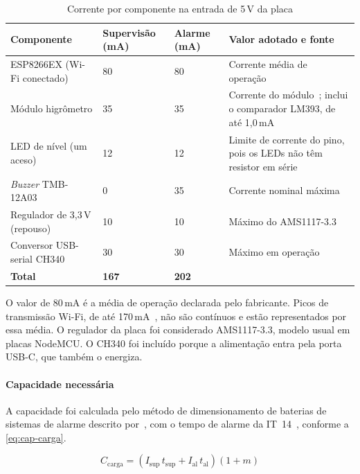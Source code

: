 \begin{table}[H]
\centering
\caption{Corrente por componente na entrada de 5\,V da placa}
\label{tab:consumo}
\small
\begin{tabular}{p{5.2cm}p{1.8cm}p{1.4cm}p{6.4cm}}
\hline
\textbf{Componente} & \textbf{Supervisão (mA)} & \textbf{Alarme (mA)} & \textbf{Valor adotado e fonte} \\
\hline
ESP8266EX (Wi-Fi conectado) & 80 & 80 & Corrente média de operação~\cite[Tabela~1-1]{espressif_esp8266ex} \\
Módulo higrômetro & 35 & 35 & Corrente do módulo~\cite{dfrobot_sen0114}; inclui o comparador LM393, de até 1,0\,mA~\cite[Seção~5.8]{ti_lm393} \\
LED de nível (um aceso) & 12 & 12 & Limite de corrente do pino, pois os LEDs não têm resistor em série~\cite[Tabela~5-1]{espressif_esp8266ex} \\
\textit{Buzzer} TMB-12A03 & 0 & 35 & Corrente nominal máxima~\cite{quickteck_tmb12a03} \\
Regulador de 3,3\,V (repouso) & 10 & 10 & Máximo do AMS1117-3.3~\cite{ams1117_datasheet} \\
Conversor USB-serial CH340 & 30 & 30 & Máximo em operação~\cite[Seção~6.2]{wch_ch340} \\
\hline
\textbf{Total} & \textbf{167} & \textbf{202} & \\
\hline
\end{tabular}
\end{table}

O valor de 80\,mA é a média de operação declarada pelo fabricante. Picos
de transmissão Wi-Fi, de até 170\,mA~\cite[Tabela~5-3]{espressif_esp8266ex},
não são contínuos e estão representados por essa média.
O regulador da placa foi considerado AMS1117-3.3, modelo usual em placas
NodeMCU. O CH340 foi incluído porque a alimentação entra pela porta
USB-C, que também o energiza.

\paragraph*{Capacidade necessária}

A capacidade foi calculada pelo método de dimensionamento de baterias de
sistemas de alarme descrito por~,
com o tempo de alarme da IT~14~\cite{cbmmg2017it14}, conforme a
\autoref{eq:cap-carga}.

\begin{equation}
\label{eq:cap-carga}
C_{\mathrm{carga}} = \left( I_{\mathrm{sup}}\, t_{\mathrm{sup}}
 + I_{\mathrm{al}}\, t_{\mathrm{al}} \right)(1 + m)
\end{equation}

